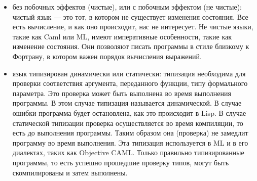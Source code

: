 \begin{itemize}
	\item без побочных эффектов (чистые), или с побочным эффектом
(не чистые): чистый язык --- это тот, в котором не существует изменения
состояния. Все есть вычисление, и как оно происходит, нас не интересует. Не
чистые языки, такие как Caml или ML, имеют императивные особенности, такие как
изменение состояния. Они позволяют писать программы в стиле близкому к Фортрану,
в котором важен порядок вычисления выражений.

	\item язык типизирован динамически или статически: типизация необходима для
проверки соответствия аргумента, переданного функции, типу формального
параметра. Это проверка может быть выполнена во время выполнения программы. В
этом случае типизация называется динамической. В случае ошибки программа будет
остановлена, как это происходит в Lisp. В случае статической типизации проверка
осуществляется во время компиляции, то есть до выполнения программы. Таким
образом она (проверка) не замедлит программу во время выполнения. Эта типизация
используется в ML и в его диалектах, таких как Objective CAML. Только правильно
типизированные программы, то есть успешно прошедшие проверку типов, могут быть
скомпилированы и затем выполнены.
\end{itemize}
